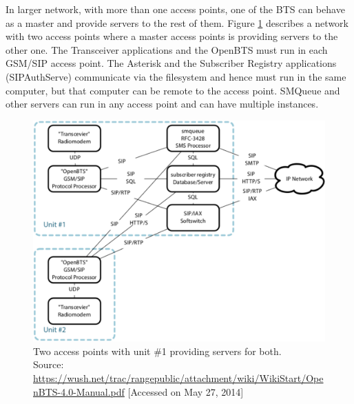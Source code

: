 In larger network, with more than one access points, one of the BTS can behave as a master
and provide servers to the rest of them. Figure \ref{fig:btsLarge} describes a network with two access points
where a master access points is providing servers to the other one.
The Transceiver applications and the OpenBTS must run in each GSM/SIP access point.
The Asterisk and the Subscriber Registry applications (SIPAuthServe) communicate via the
filesystem and hence must run in the same computer, but that computer can be remote to the
access point. SMQueue and other servers can run in any access point and can have multiple
instances.
\begin{figure}
  \centering
    \includegraphics[width=\textwidth]{btsLarge}
  \caption[OpenBTS network with two access points]{Two access points with unit 
  \#1 providing servers for both. \\
  \footnotesize{Source: \url{https://wush.net/trac/rangepublic/attachment/wiki/WikiStart/OpenBTS-4.0-Manual.pdf} [Accessed on May 27, 2014]}}
  \label{fig:btsLarge}
\end{figure}






